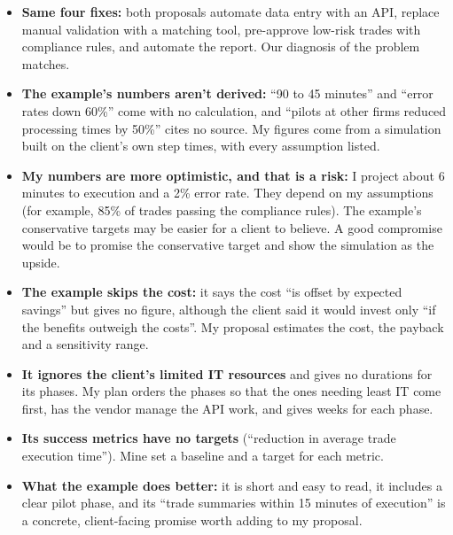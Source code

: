 \documentclass[11pt]{article}
\begin{document}
\begin{itemize}[leftmargin=1.5em, itemsep=3pt]
  \item \textbf{Same four fixes:} both proposals automate data entry with an
  API, replace manual validation with a matching tool, pre-approve low-risk
  trades with compliance rules, and automate the report. Our diagnosis of the
  problem matches.
  \item \textbf{The example's numbers aren't derived:} ``90 to 45 minutes'' and
  ``error rates down 60\%'' come with no calculation, and ``pilots at other
  firms reduced processing times by 50\%'' cites no source. My figures come
  from a simulation built on the client's own step times, with every
  assumption listed.
  \item \textbf{My numbers are more optimistic, and that is a risk:} I project
  about 6 minutes to execution and a 2\% error rate. They depend on my
  assumptions (for example, 85\% of trades passing the compliance rules). The
  example's conservative targets may be easier for a client to believe. A
  good compromise would be to promise the conservative target and show the
  simulation as the upside.
  \item \textbf{The example skips the cost:} it says the cost ``is offset by
  expected savings'' but gives no figure, although the client said it would
  invest only ``if the benefits outweigh the costs''. My proposal estimates
  the cost, the payback and a sensitivity range.
  \item \textbf{It ignores the client's limited IT resources} and gives no
  durations for its phases. My plan orders the phases so that the ones needing
  least IT come first, has the vendor manage the API work, and gives weeks for
  each phase.
  \item \textbf{Its success metrics have no targets} (``reduction in average
  trade execution time''). Mine set a baseline and a target for each metric.
  \item \textbf{What the example does better:} it is short and easy to read,
  it includes a clear pilot phase, and its ``trade summaries within 15 minutes
  of execution'' is a concrete, client-facing promise worth adding to my
  proposal.
\end{itemize}
\end{document}
